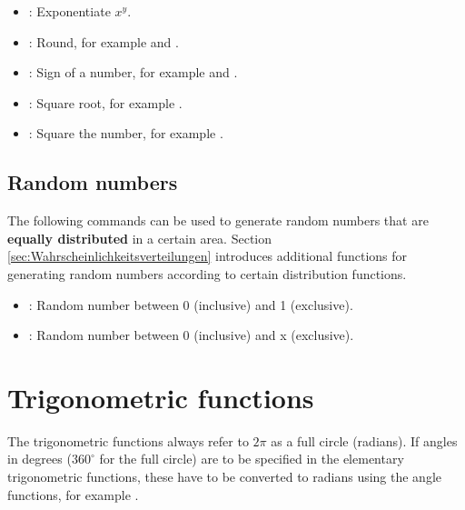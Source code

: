 \begin{itemize}
\item
{}:
Exponentiate $x^y$.

\item
{}:
Round, for example  and .

\item
{}:
Sign of a number, for example  and .

\item
{}:
Square root, for example .

\item
{}:
Square the number, for example .

\end{itemize}



\section{Random numbers}

The following commands can be used to generate random numbers
that are \textbf{equally distributed} in a certain area.
Section \ref{sec:Wahrscheinlichkeitsverteilungen} introduces
additional functions for generating random numbers according
to certain distribution functions.

\begin{itemize}

\item
{}:
Random number between 0 (inclusive) and 1 (exclusive).

\item
{}:
Random number between 0 (inclusive) and x (exclusive).

\end{itemize}





\chapter{Trigonometric functions}\label{sec:Winkelfunktionen}

The trigonometric functions always refer to $2\pi$ as a full circle (radians).
If angles in degrees ($360^\circ$ for the full circle) are to be specified
in the elementary trigonometric functions,
these have to be converted to radians using the angle functions, for example
.



